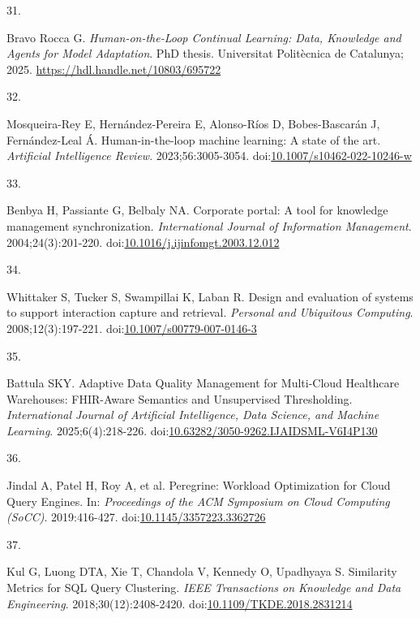 \documentclass[
  american,
  11pt,
  letterpaper,
  oneside  ,captions=tableheading
]{scrartcl}
\newlength{\cslhangindent}
\newlength{\csllabelwidth}
\newenvironment{CSLReferences}[2] %
 {\begin{list}{}{%
  \setlength{\itemindent}{0pt}
  \setlength{\leftmargin}{0pt}
  \setlength{\parsep}{0pt}
  \ifodd #1
   \setlength{\leftmargin}{\cslhangindent}
   \setlength{\itemindent}{-1\cslhangindent}
  \fi
  \setlength{\itemsep}{#2\baselineskip}}}
 {\end{list}}
\newcommand{\CSLLeftMargin}[1]{\parbox[t]{\csllabelwidth}{\strut#1\strut}}
\newcommand{\CSLRightInline}[1]{\parbox[t]{\linewidth - \csllabelwidth}{\strut#1\strut}}
\begin{document}
\begin{CSLReferences}{0}{1}
\CSLLeftMargin{31. }%
\CSLRightInline{Bravo Rocca G. \emph{Human-on-the-Loop Continual
Learning: Data, Knowledge and Agents for Model Adaptation}. PhD thesis.
Universitat Polit{è}cnica de Catalunya; 2025.
\url{https://hdl.handle.net/10803/695722}}

\CSLLeftMargin{32. }%
\CSLRightInline{Mosqueira-Rey E, Hernández-Pereira E, Alonso-Ríos D,
Bobes-Bascarán J, Fernández-Leal Á. Human-in-the-loop machine learning:
A state of the art. \emph{Artificial Intelligence Review}.
2023;56:3005-3054.
doi:\href{https://doi.org/10.1007/s10462-022-10246-w}{10.1007/s10462-022-10246-w}}

\CSLLeftMargin{33. }%
\CSLRightInline{Benbya H, Passiante G, Belbaly NA. {Corporate portal: A
tool for knowledge management synchronization}. \emph{International
Journal of Information Management}. 2004;24(3):201-220.
doi:\href{https://doi.org/10.1016/j.ijinfomgt.2003.12.012}{10.1016/j.ijinfomgt.2003.12.012}}

\CSLLeftMargin{34. }%
\CSLRightInline{Whittaker S, Tucker S, Swampillai K, Laban R. Design and
evaluation of systems to support interaction capture and retrieval.
\emph{Personal and Ubiquitous Computing}. 2008;12(3):197-221.
doi:\href{https://doi.org/10.1007/s00779-007-0146-3}{10.1007/s00779-007-0146-3}}

\CSLLeftMargin{35. }%
\CSLRightInline{Battula SKY. {Adaptive Data Quality Management for
Multi-Cloud Healthcare Warehouses: FHIR-Aware Semantics and Unsupervised
Thresholding}. \emph{International Journal of Artificial Intelligence,
Data Science, and Machine Learning}. 2025;6(4):218-226.
doi:\href{https://doi.org/10.63282/3050-9262.IJAIDSML-V6I4P130}{10.63282/3050-9262.IJAIDSML-V6I4P130}}

\CSLLeftMargin{36. }%
\CSLRightInline{Jindal A, Patel H, Roy A, et al. {Peregrine: Workload
Optimization for Cloud Query Engines}. In: \emph{Proceedings of the ACM
Symposium on Cloud Computing (SoCC)}. 2019:416-427.
doi:\href{https://doi.org/10.1145/3357223.3362726}{10.1145/3357223.3362726}}

\CSLLeftMargin{37. }%
\CSLRightInline{Kul G, Luong DTA, Xie T, Chandola V, Kennedy O,
Upadhyaya S. {Similarity Metrics for SQL Query Clustering}. \emph{IEEE
Transactions on Knowledge and Data Engineering}. 2018;30(12):2408-2420.
doi:\href{https://doi.org/10.1109/TKDE.2018.2831214}{10.1109/TKDE.2018.2831214}}


\end{CSLReferences}
\end{document}
